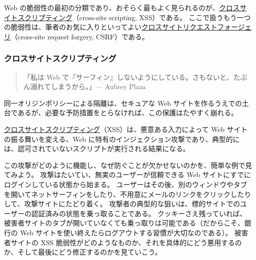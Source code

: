 \documentclass[uplatex]{jsarticle}
\def\label#1{}%
\begin{document}
Web の脆弱性の最初の分類であり、おそらく最もよく見られるのが、\underline{クロスサイトスクリプティング}（cross-site scripting, XSS）である。
ここで扱うもう一つの脆弱性は、筆者のお気に入りといってよい\underline{クロスサイトリクエストフォージェリ}（cross-site request forgery, CSRF）である。

\subsubsection{クロスサイトスクリプティング}\label{subsec:ch11-xss}

\begin{quote}
「私は Web で『サーフィン』しないようにしている。さもないと、たぶん溺れてしまうから。」\hfill --- Aubrey Plaza
\end{quote}

同一オリジンポリシーによる隔離は、セキュアな Web サイトを作るうえでの土台であるが、必要な予防措置をとらなければ、この保護はたやすく崩れる。

\begin{dfn}[クロスサイトスクリプティング]\label{dfn:ch11-xss}
\underline{クロスサイトスクリプティング}（XSS）は、悪意ある入力によって Web サイトの振る舞いを変える、Web に特有のインジェクション攻撃であり、典型的には、認可されていないスクリプトが実行される結果になる。
\end{dfn}

この攻撃がどのように機能し、なぜ防ぐことが欠かせないのかを、簡単な例で見てみよう。
攻撃はたいてい、無実のユーザーが信頼できる Web サイトにすでにログインしている状態から始まる。
ユーザーはその後、別のウィンドウやタブを開いてネットサーフィンをしたり、不用意にメールのリンクをクリックしたりして、攻撃サイトにたどり着く。
攻撃者の典型的な狙いは、標的サイトでのユーザーの認証済みの状態を乗っ取ることである。
クッキーさえ残っていれば、被害者サイトのタブが開いていなくても乗っ取りは可能である（だからこそ、銀行の Web サイトを使い終えたらログアウトする習慣が大切なのである）。
被害者サイトの XSS 脆弱性がどのようなものか、それを具体的にどう悪用するのか、そして最後にどう修正するのかを見ていこう。
\end{document}
